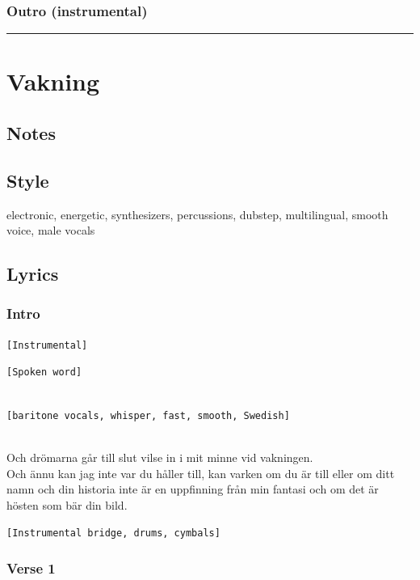 \subsubsection{Outro (instrumental)}\label{outro-instrumental}

\begin{center}\rule{0.5\linewidth}{0.5pt}\end{center}

\section{Vakning}\label{vakning}

\subsection{Notes}\label{notes-27}

\subsection{Style}\label{style-26}

electronic, energetic, synthesizers, percussions, dubstep, multilingual,
smooth voice, male vocals

\subsection{Lyrics}\label{lyrics-26}

\subsubsection{Intro}\label{intro-4}

\texttt{{[}Instrumental{]}}

\texttt{{[}Spoken\ word{]}}\strut \\
\texttt{{[}baritone\ vocals,\ whisper,\ fast,\ smooth,\ Swedish{]}}\strut \\
Och drömarna går till slut vilse in i mit minne vid vakningen.\\
Och ännu kan jag inte var du håller till, kan varken om du är till eller
om ditt namn och din historia inte är en uppfinning från min fantasi och
om det är hösten som bär din bild.

\texttt{{[}Instrumental\ bridge,\ drums,\ cymbals{]}}

\subsubsection{Verse 1}\label{verse-1-15}

